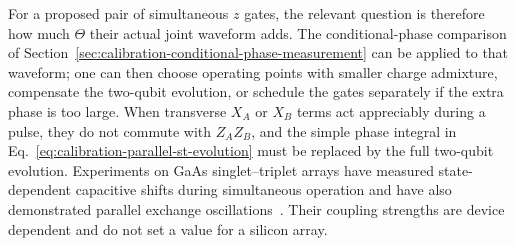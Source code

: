 For a proposed pair of simultaneous $z$ gates, the relevant question
is therefore how much $\Theta$ their actual joint waveform adds.
The conditional-phase comparison of
Section~\ref{sec:calibration-conditional-phase-measurement} can be
applied to that waveform; one can then choose operating points with
smaller charge admixture, compensate the two-qubit evolution, or
schedule the gates separately if the extra phase is too large.
When transverse $X_A$ or $X_B$ terms act appreciably during a pulse,
they do not commute with $Z_AZ_B$, and the simple phase integral in
Eq.~\eqref{eq:calibration-parallel-st-evolution} must be replaced by
the full two-qubit evolution. Experiments on GaAs
singlet--triplet arrays have measured state-dependent capacitive
shifts during simultaneous operation and have also demonstrated
parallel exchange oscillations~\cite{Yun2023,Fedele2021}. Their
coupling strengths are device dependent and do not set a value for
a silicon array.
